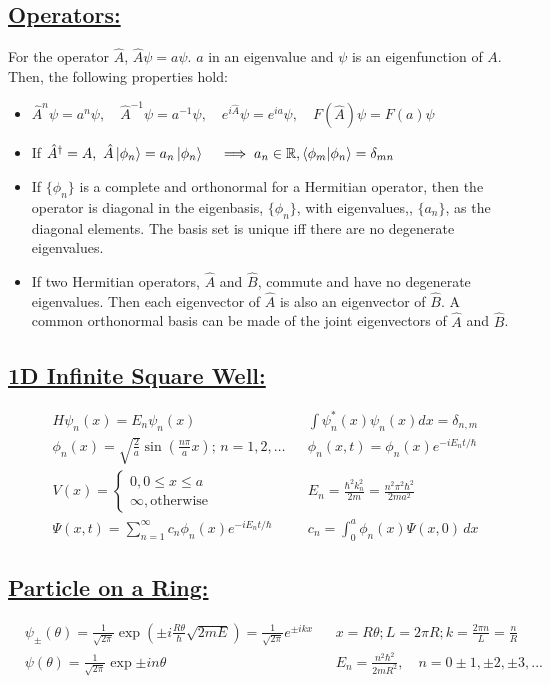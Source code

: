 \documentclass[a4paper,12pt]{article}
\begin{document}
\subsection*{\underline{Operators:}}
For the operator $\hat{A}$, $\hat{A}\psi=a\psi$. $a$ in an eigenvalue and $\psi$ is an eigenfunction of $A$. Then, the following properties hold:
\begin{itemize}
    \item $\hat{A}^n\psi=a^n\psi,\quad \hat{A}^{-1}\psi=a^{-1}\psi,\quad e^{i\hat{A}}\psi=e^{ia}\psi,\quad F(\hat{A})\psi=F(a)\psi$
    \item If $\hat{A}^{\dagger}=A,\ \hat{A}\ket{\phi_n}=a_n\ket{\phi_n} \quad \implies a_n\in \mathbb{R}, \braket{\phi_m|\phi_n}=\delta_{mn}$
    \item If $\{\phi_n\}$ is a complete and orthonormal for a Hermitian operator, then the operator is diagonal in the eigenbasis, $\{\phi_n\}$, with eigenvalues,, $\{a_n\}$, as the diagonal elements. The basis set is unique iff there are no degenerate eigenvalues.
    \item If two Hermitian operators, $\hat{A}$ and $\hat{B}$, commute and have no degenerate eigenvalues. Then each eigenvector of $\hat{A}$ is also an eigenvector of $\hat{B}$. A common orthonormal basis can be made of the joint eigenvectors of $\hat{A}$ and $\hat{B}$.
\end{itemize}

\subsection*{\underline{1D Infinite Square Well:}}
\begin{align}
     & H\psi_n(x)=E_n\psi_n(x)
     & 
     & \int\psi^*_n(x)\psi_n(x)dx=\delta_{n,m}
    \\
     & \phi_n(x)=\sqrt{\frac{2}{a}}\sin\left( \frac{n\pi}{a}x \right); \, n= 1, 2, \dots
     & 
     & \phi_n(x,t)=\phi_n(x)e^{-iE_nt/\hbar}
    \\
     & V(x)=\left\{\begin{matrix}0, 0\leq x\leq a\\\infty, \mathrm{otherwise}\end{matrix}\right.
     & 
     & E_n=\frac{\hbar^2k_n^2}{2m}=\frac{n^2\pi^2\hbar^2}{2ma^2}
    \\
     & \Psi(x,t)=\sum_{n=1}^\infty c_n\phi_n(x)e^{-iE_nt/\hbar}
     & 
     & c_n=\int_0^a\phi_n(x)\Psi(x,0)\,dx
\end{align}

\subsection*{\underline{Particle on a Ring:}}
\begin{align}
     & \psi_\pm(\theta)=\frac{1}{\sqrt{2\pi}}\exp{\left( \pm i\frac{R\theta}{\hbar}\sqrt{2mE} \right)}
    = \frac{1}{\sqrt{2\pi}}e^{\pm ikx}
     & 
     & x=R\theta; L=2\pi R; k=\frac{2\pi n}{L}=\frac{n}{R}
    \\
     & \psi(\theta)=\frac{1}{\sqrt{2\pi}}\exp{\pm in\theta}
     & 
     & E_n=\frac{n^2\hbar^2}{2mR^2},\quad n=0\pm 1,\pm 2,\pm 3,...
\end{align}
\end{document}
